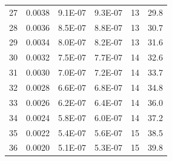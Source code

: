 {\begin{longtable}{cccccc}
27&0.0038&9.1E-07&9.3E-07&13&29.8\\
28&0.0036&8.5E-07&8.8E-07&13&30.7\\
29&0.0034&8.0E-07&8.2E-07&13&31.6\\
30&0.0032&7.5E-07&7.7E-07&14&32.6\\
31&0.0030&7.0E-07&7.2E-07&14&33.7\\
32&0.0028&6.6E-07&6.8E-07&14&34.8\\
33&0.0026&6.2E-07&6.4E-07&14&36.0\\
34&0.0024&5.8E-07&6.0E-07&14&37.2\\
35&0.0022&5.4E-07&5.6E-07&15&38.5\\
36&0.0020&5.1E-07&5.3E-07&15&39.8\\
\end{longtable}
}
